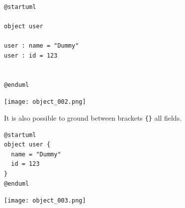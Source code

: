 \begin{lstlisting}
@startuml

object user

user : name = "Dummy"
user : id = 123


@enduml
\end{lstlisting}
\begin{center}
\texttt{[image: object\_002.png]}
\end{center}

It is also possible to ground between brackets \texttt{\{\}} all fields.

\begin{lstlisting}
@startuml
object user {
  name = "Dummy"
  id = 123
}
@enduml
\end{lstlisting}
\begin{center}
\texttt{[image: object\_003.png]}
\end{center}



	